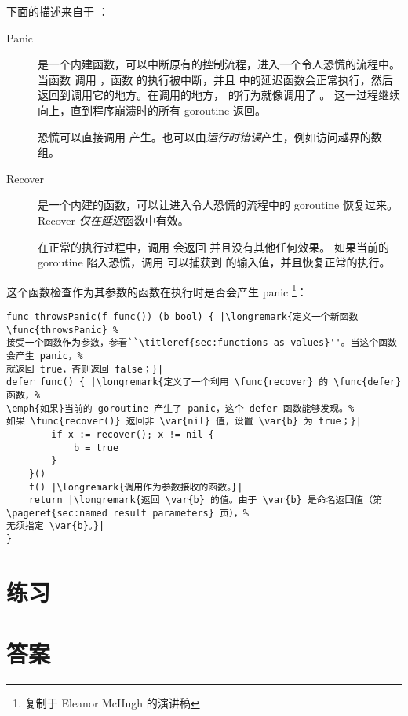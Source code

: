 下面的描述来自于 \cite{go_blog_panic}：
\begin{description}
\item[Panic]{是一个内建函数，可以中断原有的控制流程，进入一个令人恐慌的流程中。
当函数  调用 ，函数  的执行被中断，并且  中的延迟函数会正常执行，然后
 返回到调用它的地方。在调用的地方， 的行为就像调用了 。
这一过程继续向上，直到程序崩溃时的所有 goroutine 返回。

恐慌可以直接调用  产生。也可以由\emph{运行时错误}产生，例如访问越界的数组。}

\item[Recover]{是一个内建的函数，可以让进入令人恐慌的流程中的 goroutine 恢复过来。
Recover \emph{仅在}\emph{延迟}函数中有效。

在正常的执行过程中，调用  会返回  并且没有其他任何效果。
如果当前的 goroutine 陷入恐慌，调用  可以捕获到  的输入值，并且恢复正常的执行。}
\end{description}

这个函数检查作为其参数的函数在执行时是否会产生 panic
\footnote{复制于 Eleanor McHugh 的演讲稿}：
\begin{lstlisting}
func throwsPanic(f func()) (b bool) { |\longremark{定义一个新函数 \func{throwsPanic} %
接受一个函数作为参数，参看``\titleref{sec:functions as values}''。当这个函数会产生 panic，%
就返回 true，否则返回 false；}|
defer func() { |\longremark{定义了一个利用 \func{recover} 的 \func{defer} 函数，%
\emph{如果}当前的 goroutine 产生了 panic，这个 defer 函数能够发现。%
如果 \func{recover()} 返回非 \var{nil} 值，设置 \var{b} 为 true；}|
        if x := recover(); x != nil {
            b = true
        }
    }()
    f() |\longremark{调用作为参数接收的函数。}|
    return |\longremark{返回 \var{b} 的值。由于 \var{b} 是命名返回值（第 \pageref{sec:named result parameters} 页），%
无须指定 \var{b}。}|
}
\end{lstlisting}
\showremarks

\section{练习}




















\cleardoublepage
\section{答案}
\shipoutAnswer
